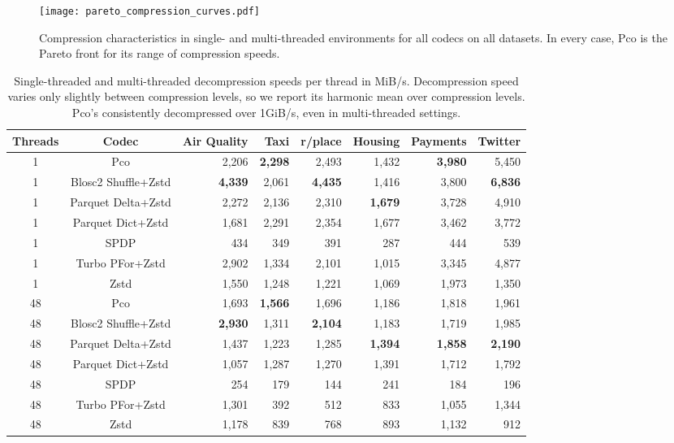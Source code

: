\documentclass[letterpaper]{article}
\begin{document}
\begin{figure}
\texttt{[image: pareto\_compression\_curves.pdf]}
\caption{
  Compression characteristics in single- and multi-threaded environments for all codecs on all datasets.
  In every case, Pco is the Pareto front for its range of compression speeds.
}
\label{fig:compression_results}
\end{figure}

\begin{table}
\begin{center}
\begin{tabular}{cc|rrrrrr}
\toprule
Threads & Codec & Air Quality & Taxi & r/place & Housing & Payments & Twitter \\
\midrule
1 & Pco & 2,206 & \textbf{2,298} & 2,493 & 1,432 & \textbf{3,980} & 5,450 \\
1 & Blosc2 Shuffle+Zstd & \textbf{4,339} & 2,061 & \textbf{4,435} & 1,416 & 3,800 & \textbf{6,836} \\
1 & Parquet Delta+Zstd & 2,272 & 2,136 & 2,310 & \textbf{1,679} & 3,728 & 4,910 \\
1 & Parquet Dict+Zstd & 1,681 & 2,291 & 2,354 & 1,677 & 3,462 & 3,772 \\
1 & SPDP & 434 & 349 & 391 & 287 & 444 & 539 \\
1 & Turbo PFor+Zstd & 2,902 & 1,334 & 2,101 & 1,015 & 3,345 & 4,877 \\
1 & Zstd & 1,550 & 1,248 & 1,221 & 1,069 & 1,973 & 1,350 \\
\cmidrule{1-8}
48 & Pco & 1,693 & \textbf{1,566} & 1,696 & 1,186 & 1,818 & 1,961 \\
48 & Blosc2 Shuffle+Zstd & \textbf{2,930} & 1,311 & \textbf{2,104} & 1,183 & 1,719 & 1,985 \\
48 & Parquet Delta+Zstd & 1,437 & 1,223 & 1,285 & \textbf{1,394} & \textbf{1,858} & \textbf{2,190} \\
48 & Parquet Dict+Zstd & 1,057 & 1,287 & 1,270 & 1,391 & 1,712 & 1,792 \\
48 & SPDP & 254 & 179 & 144 & 241 & 184 & 196 \\
48 & Turbo PFor+Zstd & 1,301 & 392 & 512 & 833 & 1,055 & 1,344 \\
48 & Zstd & 1,178 & 839 & 768 & 893 & 1,132 & 912 \\
\bottomrule
\end{tabular}

\end{center}
\caption{Single-threaded and multi-threaded decompression speeds per thread in MiB/s.
Decompression speed varies only slightly between compression levels, so we report its harmonic mean over compression levels.
Pco's consistently decompressed over 1GiB/s, even in multi-threaded settings.}
\label{tab:decompression_speeds}
\end{table}
\end{document}
